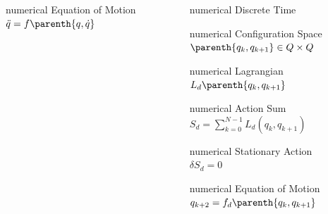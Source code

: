 \begin{frame}[noframenumbering]
\begin{columns}[c]
\begin{column}{0.5\textwidth}
            \begin{beamercolorbox}[wd=0.8\columnwidth,sep=0.05cm,center]{numerical} 
                Equation of Motion \\
                \( \ddot{q} = f \parenth{q, \dot{q} } \)
            \end{beamercolorbox}
        \end{column}
        \pause
        \begin{column}{0.5\textwidth}
            \centering
            \begin{beamercolorbox}[wd=0.8\columnwidth,sep=0.05cm,center]{numerical} Discrete Time \end{beamercolorbox}
            \begin{beamercolorbox}[wd=0.8\columnwidth,sep=0.05cm,center]{numerical} 
                Configuration Space \\
                \( \parenth{q_k, q_{k+1} } \in Q \times Q \)
            \end{beamercolorbox}
            \begin{beamercolorbox}[wd=0.8\columnwidth,sep=0.05cm,center]{numerical} 
                Lagrangian \\
                \( L_d\parenth{q_k, q_{k+1}} \)
            \end{beamercolorbox}
            \begin{beamercolorbox}[wd=0.8\columnwidth,sep=0.05cm,center]{numerical} 
                Action Sum \\
                \( S_d = \sum_{k=0}^{N-1} L_d(q_k, q_{k+1}) \)
            \end{beamercolorbox}
            \begin{beamercolorbox}[wd=0.8\columnwidth,sep=0.05cm,center]{numerical} 
                Stationary Action \\
                \( \delta S_d = 0 \)
            \end{beamercolorbox}
            \begin{beamercolorbox}[wd=0.8\columnwidth,sep=0.05cm,center]{numerical} 
                Equation of Motion \\
                \( q_{k+2} = f_d \parenth{q_k, q_{k+1} } \)
            \end{beamercolorbox}
        \end{column}
    \end{columns}
    

\end{frame}
